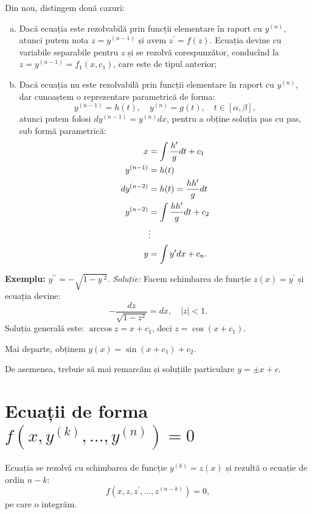 Din nou, distingem două cazuri:
\begin{enumerate}[(a)]
  \item Dacă ecuația este rezolvabilă prin funcții elementare în raport cu $ y^{(n)} $,
    atunci putem nota $ z = y^{(n-1)} $ și avem $ z^{\prime} = f(z) $. Ecuația devine cu
    variabile separabile pentru $ z $ și se rezolvă corespunzător, conducînd la
  $ z = y^{(n-1)} = f_1(x, c_1) $, care este de tipul anterior;
  \item Dacă ecuația nu este rezolvabilă prin funcții elementare în raport cu
    $ y^{(n)} $, dar cunoaștem o reprezentare parametrică de forma:
    \[
      y^{(n-1)} = h(t), \quad y^{(n)} = g(t), \quad t \in [\alpha, \beta],
    \]
    atunci putem folosi $ dy^{(n-1)} = y^{(n)} dx $, pentru a obține soluția
    pas cu pas, sub formă parametrică:
    \begin{align*}
      x &= \displaystyle\int\frac{h^{\prime}}{g} dt + c_1 \\
      y^{(n-1)} &= h(t) \\
      dy^{(n-2)} &= h(t) = \dfrac{hh^{\prime}}{g} dt \\
      y^{(n-2)} &= \displaystyle\int \frac{hh^{\prime}}{g} dt + c_2 \\
                &\vdots \\
      y &= \int y^{\prime} dx + c_n.
    \end{align*}

\end{enumerate}

\textbf{Exemplu:} $ y^{\prime\prime} = - \sqrt{1 - y^{^{\prime}2}} $.
\emph{Soluție:} Facem schimbarea de funcție $ z(x) = y^{\prime} $ și ecuația devine:
\[
  - \dfrac{dz}{\sqrt{1 - z^2}} = dx, \quad |z| < 1.
\]
Soluția generală este: $ \arccos z = x + c_1 $, deci $ z = \cos(x + c_1) $.

Mai departe, obținem $ y(x) = \sin(x + c_1) + c_2 $.

De asemenea, trebuie să mai remarcăm și soluțiile particulare $ y = \pm x + c $.


\section{Ecuații de forma $ f(x, y^{(k)}, \dots, y^{(n)}) = 0 $}

Ecuația se rezolvă cu schimbarea de funcție $ y^{(k)} = z(x) $ și rezultă
o ecuație de ordin $ n - k $:
\[
  f(x, z, z^{\prime}, \dots, z^{(n-k)}) = 0,
\]
pe care o integrăm.

